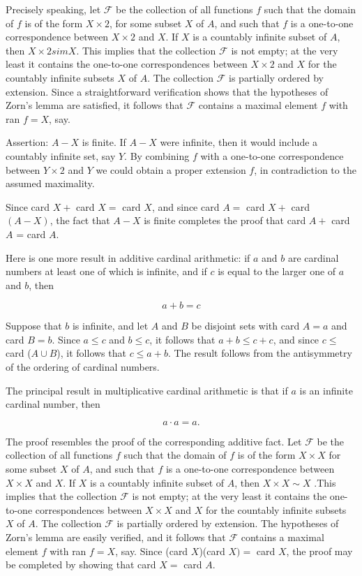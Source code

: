 Precisely speaking, let $\mathcal{F}$ be the collection of all functions $f$ such that the domain of $f$ is of the form $X \times 2$, for some subset $X$ of $A$, and such that $f$ is a one-to-one correspondence between $X \times 2$ and $X$. If $X$ is a countably infinite subset of $A$, then $X \times 2 sim X$. This implies that the collection $\mathcal{F}$ is not empty; at the very least it contains the one-to-one correspondences between $X \times 2$ and $X$ for the countably infinite subsets $X$ of $A$. The collection $\mathcal{F}$ is partially ordered by extension. Since a straightforward verification shows that the hypotheses of Zorn's lemma are satisfied, it follows that $\mathcal{F}$ contains a maximal element $f$ with ran $f = X$, say. 

Assertion: $A - X$ is finite. If $A - X$ were infinite, then it would include a countably infinite set, say $Y$. By combining $f$ with a one-to-one correspondence between $Y \times 2$ and $Y$ we could obtain a proper extension $f$, in contradiction to the assumed maximality. 

Since card $X +$ card $X =$ card $X$, and since card $A = $ card $X +$ card $(A - X)$, the fact that $A - X$ is finite completes the proof that card $A +$ card $A$ = card $A$.

Here is one more result in additive cardinal arithmetic: if $a$ and $b$ are cardinal numbers at least one of which is infinite, and if $c$ is equal to the larger one of $a$ and $b$, then 

\begin{equation*}
a + b = c
\end{equation*}

Suppose that $b$ is infinite, and let $A$ and $B$ be disjoint sets with card $A = a$ and card $B = b$. Since $a \le c$ and $b \le c$, it follows that $a + b \le c + c$, and since $c \le$ card ($A \cup B$), it follows that $c \le a + b$. The result follows from the antisymmetry of the ordering of cardinal numbers. 

The principal result in multiplicative cardinal arithmetic is that if $a$ is an infinite cardinal number, then 

\begin{equation*}
a \cdot a = a. 
\end{equation*}

The proof resembles the proof of the corresponding additive fact. Let $\mathcal{F}$ be the collection of all functions $f$ such that the domain of $f$ is of the form $X \times X$ for some subset $X$ of $A$, and such that $f$ is a one-to-one correspondence between $X \times X$ and $X$. If $X$ is a countably infinite subset of $A$, then $X \times X \sim X$ .This implies that the collection $\mathcal{F}$ is not empty; at the very least it contains the one-to-one correspondences between $X \times X$ and $X$ for the countably infinite subsets $X$ of $A$. The collection $\mathcal{F}$ is partially ordered by extension. The hypotheses of Zorn's lemma are easily verified, and it follows that $\mathcal{F}$ contains a maximal element $f$ with ran $f = X$, say. Since (card $X$)(card $X) =$ card $X$, the proof may be completed by showing that card $X =$ card $A$. 


